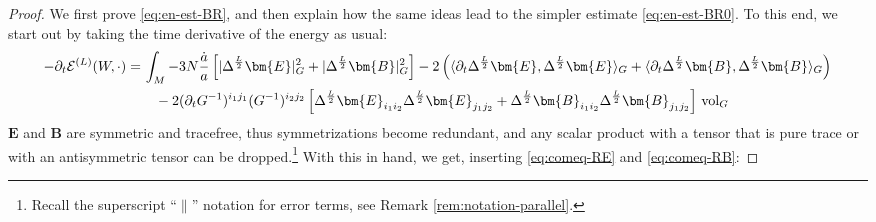\documentclass[11pt,leqno,textwidth=10cm]{amsart}
\numberwithin{equation}{section}
\theoremstyle{definition}
\theoremstyle{plain}
\newcommand{\1}{\mathbbm{1}}
\newcommand{\E}{\mathcal{E}}
\newcommand{\vol}[1]{{\text{\normalfont{vol}}}_{#1}}
\newcommand{\del}{\partial}
\newcommand{\Lap}{\Delta}
\newcommand{\RE}{\bm{E}}
\newcommand{\RB}{\bm{B}}
\begin{document}
\begin{proof}
We first prove \eqref{eq:en-est-BR}, and then explain how the same ideas lead to the simpler estimate \eqref{eq:en-est-BR0}. To this end, we start out by taking the time derivative of the energy as usual:
\begin{align*}
-\del_t\E^{(L)}(W,\cdot)=&\,\int_M-3N\frac{\dot{a}}a\left[\lvert\Lap^{\frac{L}2}\RE\rvert_G^2+\lvert\Lap^{\frac{L}2}\RB\rvert_G^2\right]-2\left(\langle\del_t\Lap^{\frac{L}2}\RE,\Lap^{\frac{L}2}\RE\rangle_G+\langle\del_t\Lap^{\frac{L}2}\RB,\Lap^{\frac{L}2}\RB\rangle_G\right)\\
&\quad-2(\del_tG^{-1})^{i_1j_1}(G^{-1})^{i_2j_2}\left[\Lap^{\frac{L}2}\RE_{i_1i_2}\Lap^{\frac{L}2}\RE_{j_1j_2}+\Lap^{\frac{L}2}\RB_{i_1i_2}\Lap^{\frac{L}2}\RB_{j_1j_2}\right]\,\vol{G}
\end{align*}
$\RE$ and $\RB$ are symmetric and tracefree, thus symmetrizations become redundant, and any scalar product with a tensor that is pure trace or with an antisymmetric tensor can be dropped.\footnote{Recall the superscript \enquote{$\parallel$} notation for error terms, see Remark \ref{rem:notation-parallel}.} With this in hand, we get, inserting \eqref{eq:comeq-RE} and \eqref{eq:comeq-RB}:


\end{proof}
\end{document}
